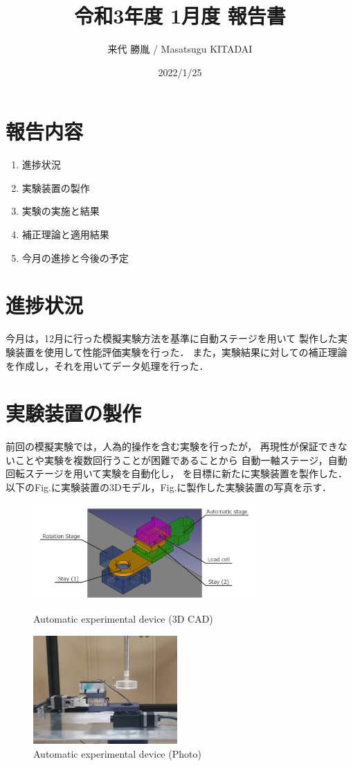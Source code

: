 \documentclass[twocolumn,a4j]{jsarticle}
\author{来代 勝胤 / Masatsugu KITADAI}
\title{令和3年度 1月度 報告書}
\date{2022/1/25}
\begin{document}
\columnseprule=0.1mm

\maketitle
\section*{報告内容}
\begin{enumerate}[1.]
    \item 進捗状況
    \item 実験装置の製作
    \item 実験の実施と結果
    \item 補正理論と適用結果
    \item 今月の進捗と今後の予定
\end{enumerate}

\section{進捗状況}
今月は，12月に行った模擬実験方法を基準に自動ステージを用いて
製作した実験装置を使用して性能評価実験を行った．
また，実験結果に対しての補正理論を作成し，それを用いてデータ処理を行った．

\section{実験装置の製作}

前回の模擬実験では，人為的操作を含む実験を行ったが，
再現性が保証できないことや実験を複数回行うことが困難であることから
自動一軸ステージ，自動回転ステージを用いて実験を自動化し，
を目標に新たに実験装置を製作した．
以下のFig.に実験装置の3Dモデル，Fig.に製作した実験装置の写真を示す．

\begin{figure}[htbp]
    \footnotesize
    \begin{center}
        \includegraphics[width=85mm]{../images/21-1.png}
        \caption{Automatic experimental device (3D CAD)}
        \includegraphics[width=55mm]{../images/device_01.jpg}
        \caption{Automatic experimental device (Photo)}
    \end{center}
\end{figure}
\end{document}
